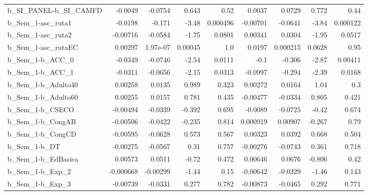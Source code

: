 \begin{tabular}{lrrrrrrrr}
b\_SI\_PANEL-b\_SI\_CAMFD      &     -0.0049 &      -0.0754 &     0.643 &     0.52 &     0.0037 &      0.0729 &        0.772 &          0.44 \\
b\_Sem\_1-asc\_ruta1          &     -0.0198 &       -0.171 &     -3.48 & 0.000496 &   -0.00701 &     -0.0641 &        -3.84 &      0.000122 \\
b\_Sem\_1-asc\_ruta2          &    -0.00716 &      -0.0584 &     -1.75 &   0.0801 &    0.00341 &      0.0304 &        -1.95 &        0.0517 \\
b\_Sem\_1-asc\_rutaEC         &     0.00297 &     1.97e-07 &   0.00045 &      1.0 &     0.0197 &    0.000215 &       0.0628 &          0.95 \\
b\_Sem\_1-b\_ACC\_0            &     -0.0349 &      -0.0746 &     -2.54 &   0.0111 &       -0.1 &      -0.306 &        -2.87 &       0.00411 \\
b\_Sem\_1-b\_ACC\_1            &     -0.0311 &      -0.0656 &     -2.15 &   0.0313 &    -0.0997 &      -0.294 &        -2.39 &        0.0168 \\
b\_Sem\_1-b\_Adulto40         &     0.00258 &       0.0135 &     0.989 &    0.323 &    0.00272 &      0.0164 &         1.04 &           0.3 \\
b\_Sem\_1-b\_Adulto60         &     0.00255 &       0.0157 &     0.781 &    0.435 &   -0.00477 &     -0.0334 &        0.805 &         0.421 \\
b\_Sem\_1-b\_CSECO            &    -0.00494 &      -0.0339 &    -0.392 &    0.695 &    -0.0089 &     -0.0725 &        -0.42 &         0.674 \\
b\_Sem\_1-b\_CongAB           &    -0.00506 &      -0.0422 &    -0.235 &    0.814 &   0.000919 &     0.00907 &       -0.267 &          0.79 \\
b\_Sem\_1-b\_CongCD           &    -0.00595 &      -0.0628 &     0.573 &    0.567 &    0.00323 &      0.0392 &        0.668 &         0.504 \\
b\_Sem\_1-b\_DT               &    -0.00275 &      -0.0567 &      0.31 &    0.757 &   -0.00276 &     -0.0743 &        0.361 &         0.718 \\
b\_Sem\_1-b\_EdBasica         &     0.00573 &       0.0511 &     -0.72 &    0.472 &    0.00646 &      0.0676 &       -0.806 &          0.42 \\
b\_Sem\_1-b\_Exp\_2            &   -0.000668 &     -0.00299 &     -1.44 &     0.15 &   -0.00642 &     -0.0329 &        -1.46 &         0.143 \\
b\_Sem\_1-b\_Exp\_3            &    -0.00739 &      -0.0331 &     0.277 &    0.782 &   -0.00873 &     -0.0465 &        0.292 &         0.771 \\

\end{tabular}
